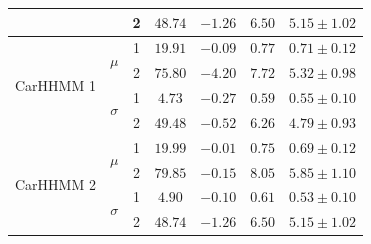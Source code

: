 \begin{table}[]
{\begin{tabular}{ccccccc}
                           &                               & 2                             & $48.74$                         & $-1.26$                     & $6.50$                             & $5.15 \pm 1.02$                             \\ \hline
\multirow{4}{*}{CarHHMM 1} & \multirow{2}{*}{$\mu$}        & 1                             & $19.91$                         & $-0.09$                     & $0.77$                             & $0.71 \pm 0.12$                             \\
                           &                               & 2                             & $75.80$                         & $-4.20$                     & $7.72$                             & $5.32 \pm 0.98$                             \\
                           & \multirow{2}{*}{$\sigma$}     & 1                             & $4.73$                         & $-0.27$                     & $0.59$                             & $0.55 \pm 0.10$                             \\
                           &                               & 2                             & $49.48$                         & $-0.52$                     & $6.26$                             & $4.79 \pm 0.93$                             \\ \hline
\multirow{4}{*}{CarHHMM 2} & \multirow{2}{*}{$\mu$}        & 1                             & $19.99$                         & $-0.01$                     & $0.75$                             & $0.69 \pm 0.12$                             \\
                           &                               & 2                             & $79.85$                         & $-0.15$                     & $8.05$                             & $5.85 \pm 1.10$                             \\
                           & \multirow{2}{*}{$\sigma$}     & 1                             & $4.90$                         & $-0.10$                     & $0.61$                             & $0.53 \pm 0.10$                             \\
                           &                               & 2                             & $48.74$                         & $-1.26$                     & $6.50$                             & $5.15 \pm 1.02$                             
\end{tabular}
}
\label{table:dive_duration}
\end{table}


